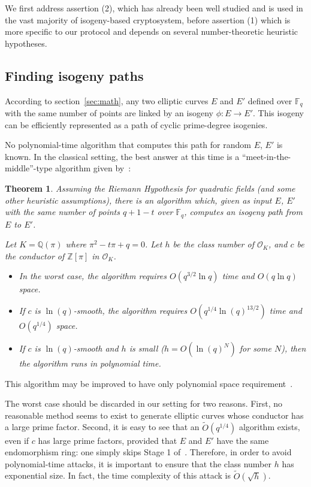 \documentclass{article}
\newcommand{\F}{\mathbb{F}}
\newcommand{\Q}{\mathbb{Q}}
\newcommand{\Z}{\mathbb{Z}}
\renewcommand{\O}{\mathcal{O}}
\newcommand{\softO}{\tilde{O}}
\newtheorem{theorem}{Theorem}[section]
\theoremstyle{definition}
\begin{document}
We first address assertion (2), which has already been well studied and
is used in the vast majority of isogeny-based cryptosystem, before
assertion (1) which is more specific to our protocol and depends on
several number-theoretic heuristic hypotheses.

\subsection{Finding isogeny paths}

According to section~\ref{sec:math}, any two elliptic curves $E$
and $E'$ defined over $\F_q$ with the same number of points are
linked by an isogeny $\phi: E\to E'$. This isogeny can be
efficiently represented as a path of cyclic prime-degree isogenies.

No polynomial-time algorithm that computes this path for
random $E$, $E'$ is known. In the classical setting, the best
answer at this time is a ``meet-in-the-middle''-type algorithm
given by~\cite{Gal}:

\begin{theorem}
Assuming the Riemann Hypothesis for quadratic fields (and
some other heuristic assumptions),
there is an algorithm which, given as input $E$, $E'$ with the
same number of points $q+1-t$ over $\F_q$, computes an isogeny path
from $E$ to $E'$.

Let $K = \Q(\pi)$ where $\pi^2 - t \pi + q = 0$. Let $h$ be the
class number of $\O_K$, and $c$ be the conductor of $\Z[\pi]$ in
$\O_K$.
\begin{itemize}
\item[(a)] In the worst case, the algorithm requires $O(q^{3/2}\ln q)$
time and $O(q\ln q)$ space.
\item[(b)] If $c$ is $\ln(q)$-smooth, the algorithm requires
$O(q^{1/4}\ln(q)^{13/2})$ time and $O(q^{1/4})$ space.
\item[(c)] If $c$ is $\ln(q)$-smooth and $h$ is small
($h = O(\ln(q)^N)$ for some $N$), then the algorithm runs in
polynomial time.
\end{itemize}
\end{theorem}

This algorithm may be improved to have only polynomial space
requirement~\cite{GHS, galbraith+stolbunov11}.

The worst case should be discarded in our setting for two reasons.
First, no reasonable method seems to exist to generate elliptic curves
whose conductor has a large prime factor. Second, it is easy to see that
an $\softO(q^{1/4})$ algorithm exists, even if $c$ has large prime factors,
provided that $E$ and $E'$ have the same endomorphism ring: one simply
skips Stage 1 of~\cite{Gal}.
Therefore, in order to avoid polynomial-time attacks, it is important
to ensure that the class number $h$ has exponential size. In fact, the
time complexity of this attack is $\softO(\sqrt{h})$.
\end{document}
